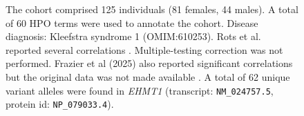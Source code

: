\begin{figure}[htbp]
\vspace{2em}

\caption{ The cohort comprised 125 individuals (81 females, 44 males). A total of 60 HPO terms were used to annotate the cohort. Disease diagnosis: Kleefstra syndrome 1 (OMIM:610253). 
Rots et al. reported several correlations \cite{PMID_39013458}. Multiple-testing correction was not performed. Frazier et al (2025) also reported significant correlations but the original data was not made available \cite{PMID_39746677}.  A total of 62 unique variant alleles were found in \textit{EHMT1} (transcript: \texttt{NM\_024757.5}, protein id: \texttt{NP\_079033.4}).}
\end{figure}

